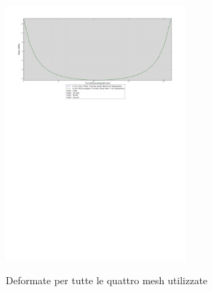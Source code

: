 \begin{figure}[p]
{\includegraphics[width=0.6\textwidth]{rel2/img2/GraficoMesh10.pdf}} \\
\caption{Deformate per tutte le quattro mesh utilizzate} \label{fig:Grafici}
\end{figure}


